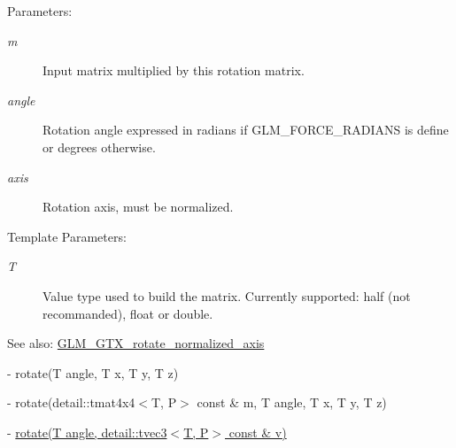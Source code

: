 \begin{Desc}
\item[Parameters:]
\begin{description}
\item[{\em m}]Input matrix multiplied by this rotation matrix. \item[{\em angle}]Rotation angle expressed in radians if GLM\_\-FORCE\_\-RADIANS is define or degrees otherwise. \item[{\em axis}]Rotation axis, must be normalized. \end{description}
\end{Desc}
\begin{Desc}
\item[Template Parameters:]
\begin{description}
\item[{\em T}]Value type used to build the matrix. Currently supported: half (not recommanded), float or double.\end{description}
\end{Desc}
\begin{Desc}
\item[See also:]\hyperlink{group__gtx__rotate__normalized__axis}{GLM\_\-GTX\_\-rotate\_\-normalized\_\-axis} 

- rotate(T angle, T x, T y, T z) 

- rotate(detail::tmat4x4$<$T, P$>$ const \& m, T angle, T x, T y, T z) 

- \hyperlink{group__gtx__transform_g52e753e0ad1cb6ae700855cc9ca921ca}{rotate(T angle, detail::tvec3$<$T, P$>$ const \& v)} \end{Desc}
